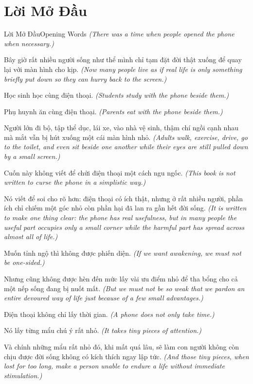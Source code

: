 \chapter*{Lời Mở Đầu}

\begin{truyen}{Lời Mở Đầu}{Opening Words}
\textit{(There was a time when people opened the phone when necessary.)}

Bây giờ rất nhiều người sống như thể mình chỉ tạm đặt đời thật xuống để quay lại với màn hình cho kịp.
\textit{(Now many people live as if real life is only something briefly put down so they can hurry back to the screen.)}

Học sinh học cùng điện thoại.
\textit{(Students study with the phone beside them.)}

Phụ huynh ăn cùng điện thoại.
\textit{(Parents eat with the phone beside them.)}

Người lớn đi bộ, tập thể dục, lái xe, vào nhà vệ sinh, thậm chí ngồi cạnh nhau mà mắt vẫn bị hút xuống một cái màn hình nhỏ.
\textit{(Adults walk, exercise, drive, go to the toilet, and even sit beside one another while their eyes are still pulled down by a small screen.)}

Cuốn này không viết để chửi điện thoại một cách ngu ngốc.
\textit{(This book is not written to curse the phone in a simplistic way.)}

Nó viết để soi cho rõ hơn: điện thoại có ích thật, nhưng ở rất nhiều người, phần ích chỉ chiếm một góc nhỏ còn phần hại đã lan ra gần hết đời sống.
\textit{(It is written to make one thing clear: the phone has real usefulness, but in many people the useful part occupies only a small corner while the harmful part has spread across almost all of life.)}

Muốn tỉnh ngộ thì không được phiến diện.
\textit{(If we want awakening, we must not be one-sided.)}

Nhưng cũng không được hèn đến mức lấy vài ưu điểm nhỏ để tha bổng cho cả một nếp sống đang bị nuốt mất.
\textit{(But we must not be so weak that we pardon an entire devoured way of life just because of a few small advantages.)}
\end{truyen}

\begin{baihoc}
Điện thoại không chỉ lấy thời gian.
\textit{(A phone does not only take time.)}

Nó lấy từng mẩu chú ý rất nhỏ.
\textit{(It takes tiny pieces of attention.)}

Và chính những mẩu rất nhỏ đó, khi mất quá lâu, sẽ làm con người không còn chịu được đời sống không có kích thích ngay lập tức.
\textit{(And those tiny pieces, when lost for too long, make a person unable to endure a life without immediate stimulation.)}
\end{baihoc}


